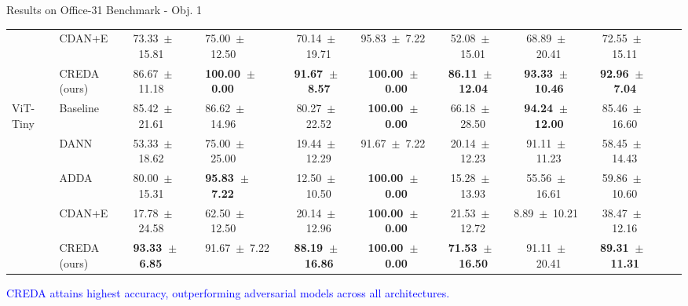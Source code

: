 \documentclass[aspectratio=169]{beamer}
\begin{document}
\begin{frame}{Results on Office-31 Benchmark - Obj. 1}
\begin{table}[H]
\begin{tabularx}{\linewidth}{p{0.6cm}p{1.35cm}p{1.35cm}lccccccc}
 & CDAN+E & 73.33~$\pm$~15.81 & 75.00~$\pm$~12.50 & 70.14~$\pm$~19.71 & 95.83~$\pm$~7.22 & 52.08~$\pm$~15.01 & 68.89~$\pm$~20.41 & 72.55~$\pm$~15.11 \\
 & CREDA (ours) & 86.67~$\pm$~11.18 & \textbf{100.00~$\pm$~0.00} & \textbf{91.67~$\pm$~8.57} & \textbf{100.00~$\pm$~0.00} & \textbf{86.11~$\pm$~12.04} & \textbf{93.33~$\pm$~10.46} & \textbf{92.96~$\pm$~7.04} \\
\midrule
\multirow{5}{*}{ViT-Tiny} & Baseline & 85.42~$\pm$~21.61 & 86.62~$\pm$~14.96 & 80.27~$\pm$~22.52 & \textbf{100.00~$\pm$~0.00} & 66.18~$\pm$~28.50 & \textbf{94.24~$\pm$~12.00} & 85.46~$\pm$~16.60 \\
 & DANN & 53.33~$\pm$~18.62 & 75.00~$\pm$~25.00 & 19.44~$\pm$~12.29 & 91.67~$\pm$~7.22 & 20.14~$\pm$~12.23 & 91.11~$\pm$~11.23 & 58.45~$\pm$~14.43 \\
 & ADDA & 80.00~$\pm$~15.31 & \textbf{95.83~$\pm$~7.22} & 12.50~$\pm$~10.50 & \textbf{100.00~$\pm$~0.00} & 15.28~$\pm$~13.93 & 55.56~$\pm$~16.61 & 59.86~$\pm$~10.60 \\
 & CDAN+E& 17.78~$\pm$~24.58 & 62.50~$\pm$~12.50 & 20.14~$\pm$~12.96 & \textbf{100.00~$\pm$~0.00} & 21.53~$\pm$~12.72 & 8.89~$\pm$~10.21 & 38.47~$\pm$~12.16 \\
 & CREDA (ours) & \textbf{93.33~$\pm$~6.85} & 91.67~$\pm$~7.22 & \textbf{88.19~$\pm$~16.86} & \textbf{100.00~$\pm$~0.00} & \textbf{71.53~$\pm$~16.50} & 91.11~$\pm$~20.41 & \textbf{89.31~$\pm$~11.31} \\
\bottomrule
\end{tabularx}
\label{tab:office31}
\end{table}
\begin{center}
    \textcolor{blue}{CREDA attains highest accuracy, outperforming adversarial models across all architectures.}
\end{center}
\end{frame}
\end{document}
